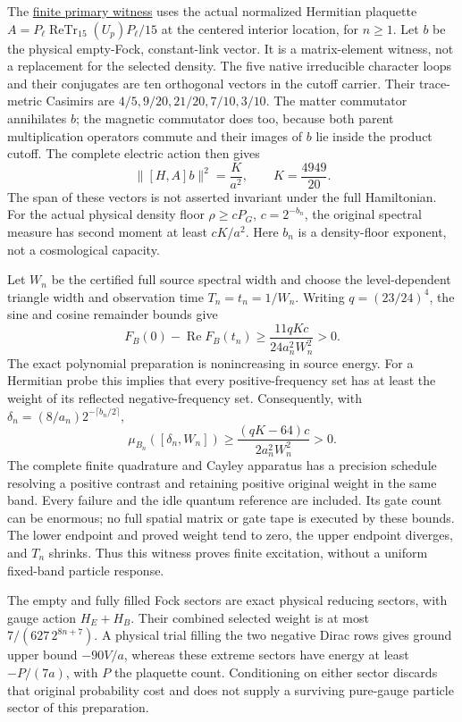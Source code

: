 The \href{https://github.com/FloatingPragma/observer-patch-holography/blob/main/model/particle_primary_survival/PROOF.md}{finite primary witness}
uses the actual normalized Hermitian plaquette
$A=P_\ell\operatorname{ReTr}_{15}(U_p)P_\ell/15$ at the centered
interior location, for $n\ge1$. Let $b$ be the physical empty-Fock,
constant-link vector. It is a matrix-element witness, not a replacement
for the selected density. The five native irreducible character loops
and their conjugates are ten orthogonal vectors in the cutoff carrier.
Their trace-metric Casimirs are
$4/5,9/20,21/20,7/10,3/10$. The matter commutator annihilates $b$;
the magnetic commutator does too, because both parent multiplication
operators commute and their images of $b$ lie inside the product cutoff.
The complete electric action then gives
\[
 \|[H,A]b\|^2=\frac{K}{a^2},\qquad K=\frac{4949}{20}.
\]
The span of these vectors is not asserted invariant under the full
Hamiltonian. For the actual physical density floor
$\rho\ge cP_G$, $c=2^{-b_n}$, the original spectral measure has second
moment at least $cK/a^2$. Here $b_n$ is a density-floor exponent, not
a cosmological capacity.

Let $W_n$ be the certified full source spectral width and choose the
level-dependent triangle width and observation time $T_n=t_n=1/W_n$.
Writing $q=(23/24)^4$, the sine and cosine remainder bounds give
\[
 F_B(0)-\operatorname{Re}F_B(t_n)
 \ge \frac{11qKc}{24a_n^2W_n^2}>0.
\]
The exact polynomial preparation is nonincreasing in source energy.
For a Hermitian probe this implies that every positive-frequency set
has at least the weight of its reflected negative-frequency set.
Consequently, with
$\delta_n=(8/a_n)2^{-\lceil b_n/2\rceil}$,
\[
 \mu_{B_n}([\delta_n,W_n])
 \ge \frac{(qK-64)c}{2a_n^2W_n^2}>0.
\]
The complete finite quadrature and Cayley apparatus has a precision
schedule resolving a positive contrast and retaining positive original
weight in the same band. Every failure and the idle quantum reference
are included. Its gate count can be enormous; no full spatial matrix or
gate tape is executed by these bounds. The lower endpoint and proved
weight tend to zero, the upper endpoint diverges, and $T_n$ shrinks.
Thus this witness proves finite excitation, without a uniform fixed-band
particle response.

The empty and fully filled Fock sectors are exact physical reducing
sectors, with gauge action $H_E+H_B$. Their combined selected weight is
at most $7/(627\,2^{8n+7})$. A physical trial filling the two
negative Dirac rows gives ground upper bound $-90V/a$, whereas these
extreme sectors have energy at least $-P/(7a)$, with $P$ the plaquette
count. Conditioning on either sector discards that original probability
cost and does not supply a surviving pure-gauge particle sector of this
preparation.

